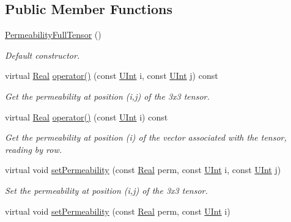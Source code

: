 \subsection*{Public Member Functions}
\begin{DoxyCompactItemize}
\item 
\hyperlink{classFVCode3D_1_1PermeabilityFullTensor_af95a504a5be8070251633802e1ef888d}{Permeability\+Full\+Tensor} ()
\begin{DoxyCompactList}\small\item\em Default constructor. \end{DoxyCompactList}\item 
virtual \hyperlink{namespaceFVCode3D_a40c1f5588a248569d80aa5f867080e83}{Real} \hyperlink{classFVCode3D_1_1PermeabilityFullTensor_a2fb43c29985b36e4804bd69826d9ab58}{operator()} (const \hyperlink{namespaceFVCode3D_a4bf7e328c75d0fd504050d040ebe9eda}{U\+Int} i, const \hyperlink{namespaceFVCode3D_a4bf7e328c75d0fd504050d040ebe9eda}{U\+Int} j) const 
\begin{DoxyCompactList}\small\item\em Get the permeability at position (i,j) of the 3x3 tensor. \end{DoxyCompactList}\item 
virtual \hyperlink{namespaceFVCode3D_a40c1f5588a248569d80aa5f867080e83}{Real} \hyperlink{classFVCode3D_1_1PermeabilityFullTensor_a0966668aa41720f65aa7b998b0969cf3}{operator()} (const \hyperlink{namespaceFVCode3D_a4bf7e328c75d0fd504050d040ebe9eda}{U\+Int} i) const 
\begin{DoxyCompactList}\small\item\em Get the permeability at position (i) of the vector associated with the tensor, reading by row. \end{DoxyCompactList}\item 
virtual void \hyperlink{classFVCode3D_1_1PermeabilityFullTensor_a0a76c41f195c37b6218fa97338863d19}{set\+Permeability} (const \hyperlink{namespaceFVCode3D_a40c1f5588a248569d80aa5f867080e83}{Real} perm, const \hyperlink{namespaceFVCode3D_a4bf7e328c75d0fd504050d040ebe9eda}{U\+Int} i, const \hyperlink{namespaceFVCode3D_a4bf7e328c75d0fd504050d040ebe9eda}{U\+Int} j)
\begin{DoxyCompactList}\small\item\em Set the permeability at position (i,j) of the 3x3 tensor. \end{DoxyCompactList}\item 
virtual void \hyperlink{classFVCode3D_1_1PermeabilityFullTensor_a2919e222048216392a62891a526732d8}{set\+Permeability} (const \hyperlink{namespaceFVCode3D_a40c1f5588a248569d80aa5f867080e83}{Real} perm, const \hyperlink{namespaceFVCode3D_a4bf7e328c75d0fd504050d040ebe9eda}{U\+Int} i)

\end{DoxyCompactItemize}
